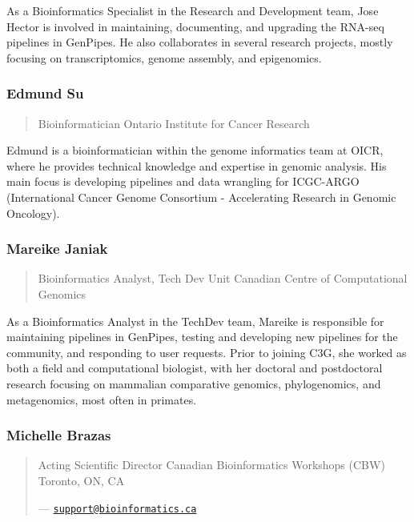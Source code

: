 \documentclass[
]{book}
\begin{document}
As a Bioinformatics Specialist in the Research and Development team,
Jose Hector is involved in maintaining, documenting, and upgrading
the RNA-seq pipelines in GenPipes. He also collaborates in several research projects, mostly
focusing on transcriptomics, genome assembly, and epigenomics.

\subsubsection{Edmund Su}\label{edmund-su}

\begin{quote}
Bioinformatician
Ontario Institute for Cancer Research
\end{quote}

Edmund is a bioinformatician within the genome informatics team at OICR,
where he provides technical knowledge and expertise in genomic analysis.
His main focus is developing pipelines and data wrangling for ICGC-ARGO
(International Cancer Genome Consortium - Accelerating Research in Genomic Oncology).

\subsubsection{Mareike Janiak}\label{mareike-janiak}

\begin{quote}
Bioinformatics Analyst, Tech Dev Unit
Canadian Centre of Computational Genomics
\end{quote}

As a Bioinformatics Analyst in the TechDev team, Mareike is responsible
for maintaining pipelines in GenPipes, testing and developing new pipelines
for the community, and responding to user requests. Prior to joining C3G,
she worked as both a field and computational biologist, with her doctoral and postdoctoral
research focusing on mammalian comparative genomics, phylogenomics, and metagenomics,
most often in primates.

\subsubsection{Michelle Brazas}\label{michelle-brazas}

\begin{quote}
Acting Scientific Director
Canadian Bioinformatics Workshops (CBW)
Toronto, ON, CA

--- \href{mailto:support@bioinformatics.ca}{\nolinkurl{support@bioinformatics.ca}}
\end{quote}
\end{document}
